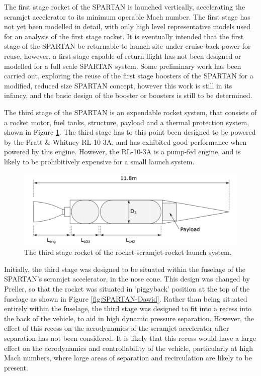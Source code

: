  

The first stage rocket of the SPARTAN is launched vertically, accelerating the scramjet accelerator to its minimum operable Mach number. The first stage has not yet been modelled in detail, with only high level representative models used for an analysis of the first stage rocket\cite{Preller2018a}.
It is eventually intended that the first stage of the SPARTAN be returnable to launch site under cruise-back power for reuse, however, a first stage capable of return flight has not been designed or modelled for a full scale SPARTAN system\cite{Preller2017b,Preller2018a}.
 Some preliminary work has been carried out, exploring the reuse of the first stage boosters of the SPARTAN \cite{chai2017} for a modified, reduced size SPARTAN concept, however this work is still in its infancy, and the basic design of the booster or boosters is still to be determined\cite{Preller2017b,Preller2018a}.
 
  

The third stage of the SPARTAN is an expendable rocket system, that consists of a rocket motor, fuel tanks, structure, payload and a thermal protection system\cite{Preller2017b}, shown in Figure \ref{fig:ThirdStage}. The third stage has to this point been designed to be powered by the Pratt \& Whitney RL-10-3A\cite{Preller2017b}, and has exhibited good performance when powered by this engine. However, the RL-10-3A is a pump-fed engine, and is likely to be prohibitively expensive for a small launch system.
\begin{figure}[ht]
	\centering
	\includegraphics[width=0.7\linewidth]{figures/2_literature-review/ThirdStage}
	\caption{The third stage rocket of the rocket-scramjet-rocket launch system\cite{Preller2017b}.}
	\label{fig:ThirdStage}
\end{figure}
 Initially, the third stage was designed to be situated within the fuselage of the SPARTAN's scramjet accelerator, in the nose cone\cite{Jazra2013}. This design was changed by Preller\cite{Preller2018a,Preller2017b}, so that the rocket was situated in 'piggyback' position at the top of the fuselage as shown in Figure \ref{fig:SPARTAN-Dawid}. Rather than being situated entirely within the fuselage, the third stage was designed to fit into a recess into the back of the vehicle, to aid in high dynamic pressure separation. However, the effect of this recess on the aerodynamics of the scramjet accelerator after separation has not been considered\cite{Preller2018a,Preller2017b}. It is likely that this recess would have a large effect on the aerodynamics and controllability of the vehicle, particularly at high Mach numbers, where large areas of separation and recirculation are likely to be present. 





